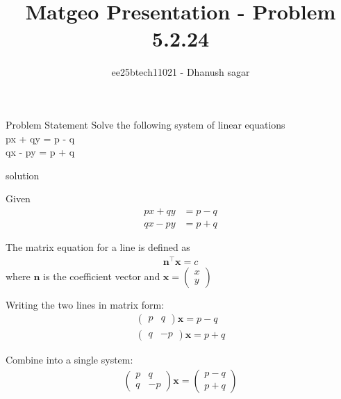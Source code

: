 \documentclass{beamer}
\title{Matgeo Presentation - Problem 5.2.24}
\author{ee25btech11021 - Dhanush sagar}
\numberwithin{equation}{section}
\theoremstyle{remark}
\newcommand{\myvec}[1]{\ensuremath{\begin{pmatrix}#1\end{pmatrix}}}
\let\vec\mathbf
\begin{document}
	

		




\begin{frame}
  \titlepage
\end{frame}

\begin{frame}{Problem Statement}
Solve the following system of linear equations\\

px + qy = p - q \\
qx - py = p + q \\ 
\end{frame}

\begin{frame}{solution}

Given
\begin{align}
px + qy &= p - q \\
qx - py &= p + q
\end{align}

The matrix equation for a line is defined as
\begin{align}
\vec{n}^\top \vec{x} = c
\end{align}
where $\vec{n}$ is the coefficient vector and $\vec{x} = \myvec{x\\y}$

Writing the two lines in matrix form:
\begin{align}
\myvec{p & q} \vec{x} = p - q \\
\myvec{q & -p} \vec{x} = p + q
\end{align}

Combine into a single system:
\begin{align}
\myvec{p & q \\ q & -p} \vec{x} = \myvec{p-q \\ p+q}
\end{align}

\end{frame}
\end{document}
